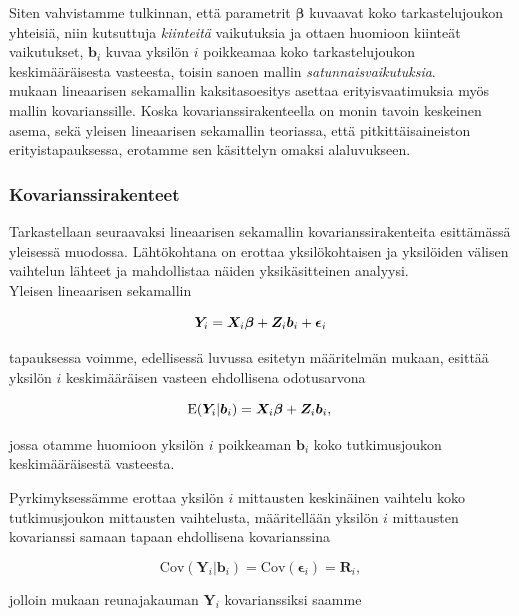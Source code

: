 \documentclass[finnish]{docopts}
\begin{document}
Siten vahvistamme tulkinnan, että parametrit $\bm{\beta}$ kuvaavat koko tarkastelujoukon yhteisiä, niin kutsuttuja \textit{kiinteitä} vaikutuksia ja ottaen huomioon kiinteät vaikutukset, $\bm{b}_i$ kuvaa yksilön $i$ poikkeamaa koko tarkastelujoukon keskimääräisesta vasteesta, toisin sanoen mallin \textit{satunnaisvaikutuksia}. \\

\cite{fitzmaurice11} mukaan lineaarisen sekamallin kaksitasoesitys asettaa erityisvaatimuksia myös mallin kovarianssille. Koska kovarianssirakenteella on monin tavoin keskeinen asema, sekä yleisen lineaarisen sekamallin teoriassa, että pitkittäisaineiston erityistapauksessa, erotamme sen käsittelyn omaksi alaluvukseen.\\ 

\subsubsection{Kovarianssirakenteet}
\label{sub:kovarianssirakenteet}

Tarkastellaan seuraavaksi lineaarisen sekamallin kovarianssirakenteita \cite{fitzmaurice11} esittämässä yleisessä muodossa. Lähtökohtana on erottaa yksilökohtaisen ja yksilöiden välisen vaihtelun lähteet ja mahdollistaa näiden yksikäsitteinen analyysi.\\

Yleisen lineaarisen sekamallin

$$
\bm{Y}_i = \bm{X}_i \bm{\beta} + \bm{Z}_i \bm{b}_i + \bm{\epsilon}_i \\
$$

tapauksessa voimme, edellisessä luvussa esitetyn määritelmän mukaan, esittää yksilön $i$ keskimääräisen vasteen ehdollisena odotusarvona

$$
\text{E}(\bm{Y}_i | \bm{b}_i) = \bm{X}_i \bm{\beta} + \bm{Z}_i \bm{b}_i, \\
$$

jossa otamme huomioon yksilön $i$ poikkeaman $\bm{b}_i$ koko tutkimusjoukon keskimääräisestä vasteesta.

Pyrkimyksessämme erottaa yksilön $i$ mittausten keskinäinen vaihtelu koko tutkimusjoukon mittausten vaihtelusta, määritellään yksilön $i$ mittausten kovarianssi samaan tapaan ehdollisena kovarianssina 

$$
\text{Cov}(\bm{Y}_i | \bm{b}_i) = \text{Cov}(\bm{\epsilon}_i) = \bm{R}_i,
$$

jolloin \cite{fitzmaurice11} mukaan reunajakauman $\bm{Y}_i$ kovarianssiksi saamme
\end{document}
